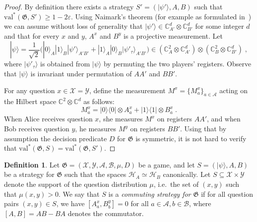 \documentclass{book}
\theoremstyle{plain}
\theoremstyle{definition}
\newtheorem{definition}[subsection]{Definition}
\theoremstyle{remark}
\numberwithin{equation}{subsection}
\newcommand{\cal}[1]{\mathcal{#1}}
\newcommand{\mH}{\mathcal{H}}
\newcommand{\eps}{\varepsilon}
\newcommand{\C}{\mathbb{C}}
\newcommand{\ket}[1]{|#1\rangle}
\newcommand{\bra}[1]{\langle#1|}
\newcommand{\ketbra}[2]{\ket{#1}\!\bra{#2}}
\newcommand{\game}{\mathfrak{G}}
\newcommand{\strategy}{{S}}
\newcommand{\val}{\ensuremath{\mathrm{val}}}
\newcommand{\alice}{A}
\newcommand{\bob}{B}
\begin{document}
\begin{proof}
  By definition there exists a strategy $\strategy'= (\ket{\psi'},A,B)$ such
  that $\val^*(\game,\strategy')\geq 1-2\eps$.
Using Naimark's theorem (for example as formulated in~\cite[Theorem 4.2]{NW19}) we can assume
without loss of generality that $\ket{\psi'}\in\C_{\alice'}^d\otimes \C_{\bob'}^d$ for some integer $d$
  and that for every $x$ and $y$, $A^x$ and $B^y$ is a projective measurement.
  Let
  \[
    \ket{\psi} = \frac{1}{\sqrt{2}} \big( \ket{0}_\alice \ket{1}_\bob
    \ket{\psi'}_{\alice'\bob'} + \ket{1}_\alice \ket{0}_\bob
    \ket{\psi'_\tau}_{\alice'\bob'}\big) \in (\C_{\alice}^2 \otimes
    \C_{\alice'}^d) \otimes (\C_\bob^2 \otimes \C_{\bob'}^d)\;,
  \]
  where $\ket{\psi'_\tau}$ is obtained from $\ket{\psi}$ by permuting the two
  players' registers.
  Observe that $\ket{\psi}$ is invariant under permutation of $\alice\alice'$
  and $\bob\bob'$.
  
  For any question $x\in \cal{X}=\cal{Y}$, define the measurement $M^x = \{M^x_a\}_{a \in \cal{A}}$
  acting on the Hilbert space $\C^2 \otimes \C^d$ as follows:
  \[
  	M^x_a = \ketbra{0}{0} \otimes A^x_a + \ketbra{1}{1} \otimes B^x_a \;.
  \]
  When Alice receives question $x$, she measures $M^x$ on registers $\alice \alice'$, and when Bob receives 
  question $y$, he measures $M^y$ on registers $\bob \bob'$.
  Using that by assumption the decision predicate $D$ for $\game$ is symmetric,
  it is not hard to verify that $\val^*(\game,\strategy) =
  \val^*(\game,\strategy')$.
\end{proof}

\begin{definition}
  \label{def:comm-strategy}
  Let $\game = (\cal{X}, \cal{Y}, \cal{A}, \cal{B}, \mu, D)$ be a game, and let
  $\strategy = (\ket{\psi}, A, B)$ be a strategy for $\game$ such that the
  spaces $\mH_A \simeq \mH_B$ canonically.
  Let $S \subseteq \cal{X} \times \cal{Y}$ denote the support of the question
  distribution $\mu$, i.e.\ the set of $(x,y)$ such that $\mu(x,y)>0$.
  We say that $\strategy$ is a \emph{commuting strategy for $\game$} if for all
  question pairs $(x, y) \in S$, we have $[A^x_a, B^y_b] = 0$ 
  for all $a
  \in \cal{A}, b \in \cal{B}$, where $[A, B] = AB - BA$ denotes the commutator.
\end{definition}
\end{document}
